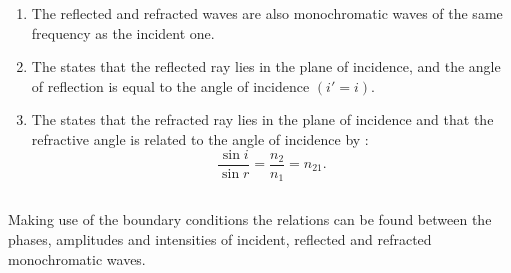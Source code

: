 \begin{enumerate}[label=(\alph*)]
\item The reflected and refracted waves are also monochromatic
waves of the same frequency as the incident one.
\item The  states that the reflected ray lies in the plane of incidence, and the angle of reflection is equal to the angle of incidence $(i' = i)$.
\item The  states that the refracted ray lies in the plane of incidence and that the refractive angle is related to the angle of incidence by :
\begin{equation*}%
\frac{\sin i}{\sin r} = \frac{n_{2}}{n_{1}} = n_{21}.
\end{equation*}
\end{enumerate}


 
\subsection{}\label{31.5.4} Making use of the boundary conditions  the relations can be found between the phases, amplitudes and intensities of incident, reflected and refracted monochromatic waves.


